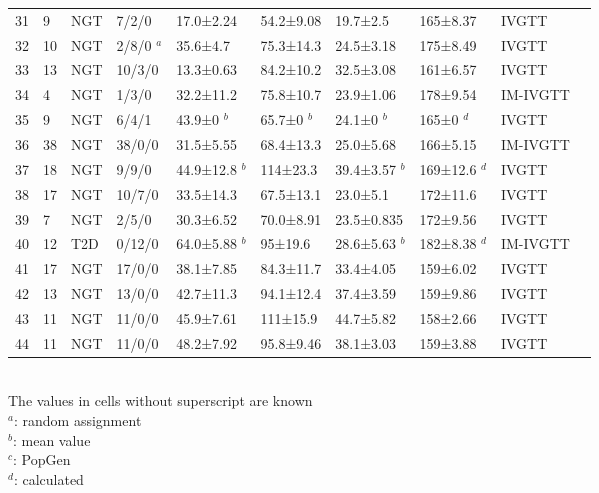 \documentclass[utf8]{frontiersSCNS} %
\begin{document}
\begin{table}[h]
{\begin{tabular}{llllllllll}
31 & 9  & NGT & 7/2/0   & 17.0±2.24     & 54.2±9.08 & 19.7±2.5    & 165±8.37   & IVGTT   & \citet{pagano_1995}                      \\
32 & 10 & NGT & 2/8/0 $^a$ & 35.6±4.7    & 75.3±14.3 & 24.5±3.18   & 175±8.49   & IVGTT    & \citet{2001_MyocInfarct_Cavallo} \\
33 & 13 & NGT & 10/3/0  & 13.3±0.63   & 84.2±10.2 & 32.5±3.08   & 161±6.57   & IVGTT    & \citet{Cerutti1998}                      \\
34 & 4  & NGT & 1/3/0   & 32.2±11.2   & 75.8±10.7 & 23.9±1.06   & 178±9.54   & IM-IVGTT & \citet{2002_AGENESIS_Roden}      \\
35 & 9  & NGT & 6/4/1   & 43.9±0 $^b$    & 65.7±0 $^b$  & 24.1±0 $^b$    & 165±0 $^d$    & IVGTT & \citet{2008_hanisurya_thyroid} \\
36 & 38 & NGT & 38/0/0  & 31.5±5.55   & 68.4±13.3 & 25.0±5.68     & 166±5.15   & IM-IVGTT & \citet{2012_pGDM_tura}           \\
37 & 18 & NGT & 9/9/0   & 44.9±12.8 $^b$ & 114±23.3  & 39.4±3.57 $^b$ & 169±12.6 $^d$ & IVGTT    & \cite{Kautzky-Willer1992} \\
38 & 17 & NGT & 10/7/0  & 33.5±14.3   & 67.5±13.1 & 23.0±5.1      & 172±11.6   & IVGTT    & \citet{Kautzky-Willer1992}     \\
39 & 7  & NGT & 2/5/0   & 30.3±6.52   & 70.0±8.91   & 23.5±0.835  & 172±9.56   & IVGTT    & \citet{alex_1996}                     \\
40 & 12 & T2D & 0/12/0  & 64.0±5.88 $^b$   & 95±19.6   & 28.6±5.63 $^b$ & 182±8.38 $^d$ & IM-IVGTT & \citet{2010_alcohol_ludvik}      \\
41 & 17 & NGT & 17/0/0  & 38.1±7.85   & 84.3±11.7 & 33.4±4.05   & 159±6.02   & IVGTT     & \citet{2006_Davi_JACC}           \\
42 & 13 & NGT & 13/0/0  & 42.7±11.3   & 94.1±12.4 & 37.4±3.59   & 159±9.86   & IVGTT    & \citet{2006_Davi_JACC}           \\
43 & 11 & NGT & 11/0/0  & 45.9±7.61   & 111±15.9  & 44.7±5.82   & 158±2.66   & IVGTT    & \citet{2003_INFLAMMATORY_Davi}   \\
44 & 11 & NGT & 11/0/0  & 48.2±7.92   & 95.8±9.46 & 38.1±3.03   & 159±3.88   & IVGTT    & \citet{2003_INFLAMMATORY_Davi}  \\ \hline
\end{tabular}}
\\
The values in cells without superscript are known \\ 
$^a$: random assignment \\
$^b$: mean value \\
$^c$: PopGen \\
$^d$: calculated \\
\end{table}
\end{document}
